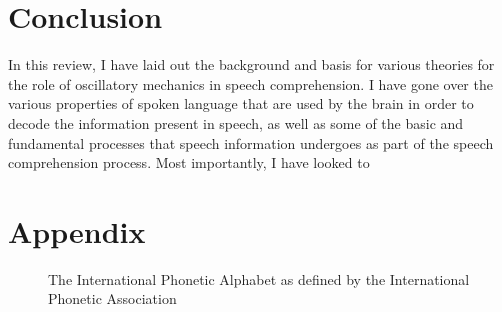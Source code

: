 \documentclass[titlepage]{article}
\begin{document}
\section{Conclusion}

    In this review, I have laid out the background and basis for 
    various theories for the role of oscillatory mechanics in speech 
    comprehension. I have gone over the various properties of spoken language 
    that are used by the brain in order to decode the information present in 
    speech, as well as some of the basic and fundamental processes that 
    speech information undergoes as part of the speech comprehension process. 
    Most importantly, I have looked to 

\appendix
\section{Appendix}

\renewcommand\thefigure{\thesection.\arabic{figure}}    
\setcounter{figure}{0}

  \begin{figure}
    \caption{The International Phonetic Alphabet as defined by the International
    Phonetic Association}
    \label{ipaChart}
  \end{figure}

\newpage
\printbibliography
\end{document}
